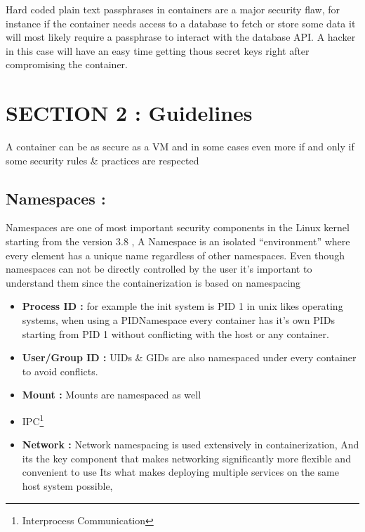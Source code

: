 \documentclass[
  14pt,
  english,
  a4paper,
]{scrreprt}
\begin{document}
Hard coded plain text passphrases in containers are a major security
flaw, for instance if the container needs access to a database to fetch
or store some data it will most likely require a passphrase to interact
with the database API. A hacker in this case will have an easy time
getting thous secret keys right after compromising the container.

\hypertarget{section-2-guidelines}{%
\section{SECTION 2 : Guidelines}\label{section-2-guidelines}}

A container can be as secure as a VM and in some cases even more if and
only if some security rules \& practices are respected

\hypertarget{namespaces}{%
\subsection{Namespaces :}\label{namespaces}}

Namespaces are one of most important security components in the Linux
kernel starting from the version 3.8 , A Namespace is an isolated
``environment'' where every element has a unique name regardless of
other namespaces. Even though namespaces can not be directly controlled
by the user it's important to understand them since the containerization
is based on namespacing

\begin{itemize}
\item
  \textbf{Process ID :} for example the init system is PID 1 in unix
  likes operating systems, when using a PIDNamespace every container has
  it's own PIDs starting from PID 1 without conflicting with the host or
  any container.
\item
  \textbf{User/Group ID :} UIDs \& GIDs are also namespaced under every
  container to avoid conflicts.
\item
  \textbf{Mount :} Mounts are namespaced as well
\item
  IPC\footnote{Interprocess Communication}
\item
  \textbf{Network :} Network namespacing is used extensively in
  containerization, And its the key component that makes networking
  significantly more flexible and convenient to use Its what makes
  deploying multiple services on the same host system possible,
\end{itemize}
\end{document}
